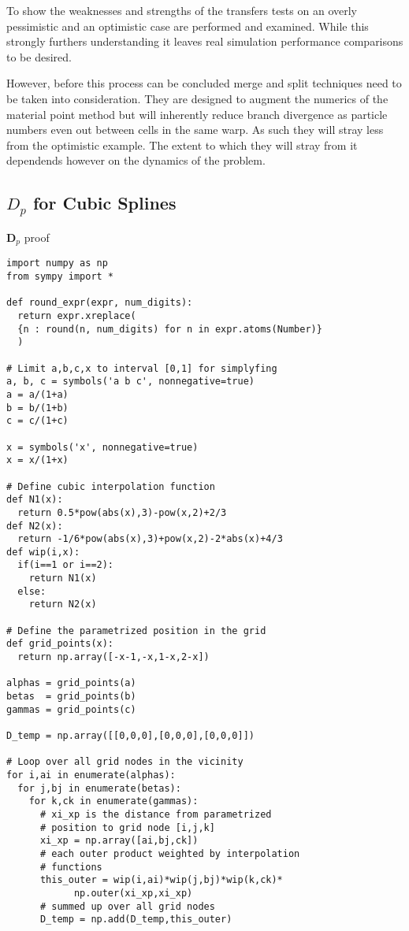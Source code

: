 \documentclass[m,times]{cgMA}
\begin{document}
To show the weaknesses and strengths of the transfers tests on an overly pessimistic and an optimistic case are performed and examined. While this strongly furthers understanding it leaves real simulation performance comparisons to be desired.

However, before this process can be concluded merge and split techniques need to be taken into consideration. They are designed to augment the numerics of the material point method but will inherently reduce branch divergence as particle numbers even out between cells in the same warp. As such they will stray less from the optimistic example. The extent to which they will stray from it dependends however on the dynamics of the problem.
\clearpage
\begin{appendices}
\section{$D_p$ for Cubic Splines}\label{app:dp_proof}
  \begin{code}
\caption{$\boldsymbol{D}_p$ proof}
  \begin{verbatim}
import numpy as np
from sympy import *

def round_expr(expr, num_digits):
  return expr.xreplace(
  {n : round(n, num_digits) for n in expr.atoms(Number)}
  )

# Limit a,b,c,x to interval [0,1] for simplyfing
a, b, c = symbols('a b c', nonnegative=true)
a = a/(1+a)
b = b/(1+b)
c = c/(1+c)

x = symbols('x', nonnegative=true)
x = x/(1+x)

# Define cubic interpolation function
def N1(x):
  return 0.5*pow(abs(x),3)-pow(x,2)+2/3
def N2(x):
  return -1/6*pow(abs(x),3)+pow(x,2)-2*abs(x)+4/3
def wip(i,x):
  if(i==1 or i==2):
    return N1(x)
  else:
    return N2(x)

# Define the parametrized position in the grid
def grid_points(x):
  return np.array([-x-1,-x,1-x,2-x])

alphas = grid_points(a)
betas  = grid_points(b)
gammas = grid_points(c)

D_temp = np.array([[0,0,0],[0,0,0],[0,0,0]])

# Loop over all grid nodes in the vicinity
for i,ai in enumerate(alphas):
  for j,bj in enumerate(betas):
    for k,ck in enumerate(gammas):
      # xi_xp is the distance from parametrized
      # position to grid node [i,j,k]
      xi_xp = np.array([ai,bj,ck])
      # each outer product weighted by interpolation
      # functions
      this_outer = wip(i,ai)*wip(j,bj)*wip(k,ck)*
		    np.outer(xi_xp,xi_xp)
      # summed up over all grid nodes
      D_temp = np.add(D_temp,this_outer)


\end{verbatim}
\end{code}
\end{appendices}
\end{document}
